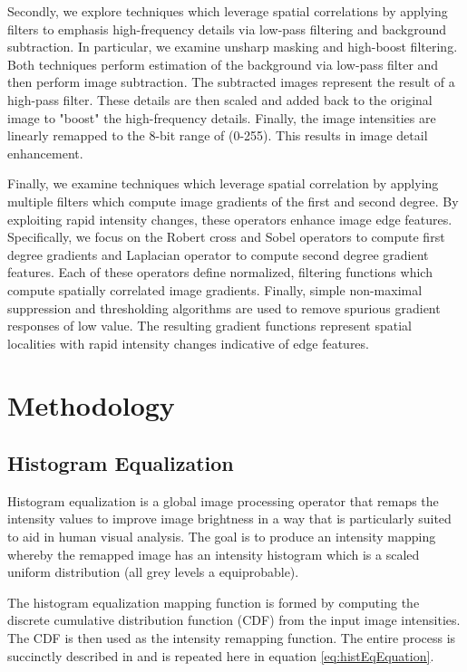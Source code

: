 \documentclass[journal]{IEEEtran}
\begin{document}
\par Secondly, we explore techniques which leverage spatial correlations by applying filters to emphasis high-frequency details via low-pass filtering and background subtraction. In particular, we examine unsharp masking and high-boost filtering. Both techniques perform estimation of the background via low-pass filter and then perform image subtraction. The subtracted images represent the result of a high-pass filter. These details are then scaled and added back to the original image to "boost" the high-frequency details. Finally, the image intensities are linearly remapped to the 8-bit range of (0-255). This results in image detail enhancement. \cite[p.~162-165]{Gonzalez}

\par Finally, we examine techniques which leverage spatial correlation by applying multiple filters which compute image gradients of the first and second degree. By exploiting rapid intensity changes, these operators enhance image edge features. Specifically, we focus on the Robert cross and Sobel operators to compute first degree gradients and Laplacian operator to compute second degree gradient features. Each of these operators define normalized, filtering functions which compute spatially correlated image gradients. Finally, simple non-maximal suppression and thresholding algorithms are used to remove spurious gradient responses of low value. The resulting gradient functions represent spatial localities with rapid intensity changes indicative of edge features. \cite[p.~165-172]{Gonzalez}

\section{Methodology}
\subsection{Histogram Equalization}
\par Histogram equalization is a global image processing operator that remaps the intensity values to improve image brightness in a way that is particularly suited to aid in human visual analysis. The goal is to produce an intensity mapping whereby the remapped image has an intensity histogram which is a scaled uniform distribution (all grey levels a equiprobable). \cite[p.~75]{Nixon}
\par The histogram equalization mapping function is formed by computing the discrete cumulative distribution function (CDF) from the input image intensities. The CDF is then used as the intensity remapping function. The entire process is succinctly described in \cite[p.~122-128]{Gonzalez} and is repeated here in equation \ref{eq:histEqEquation}.
\end{document}
